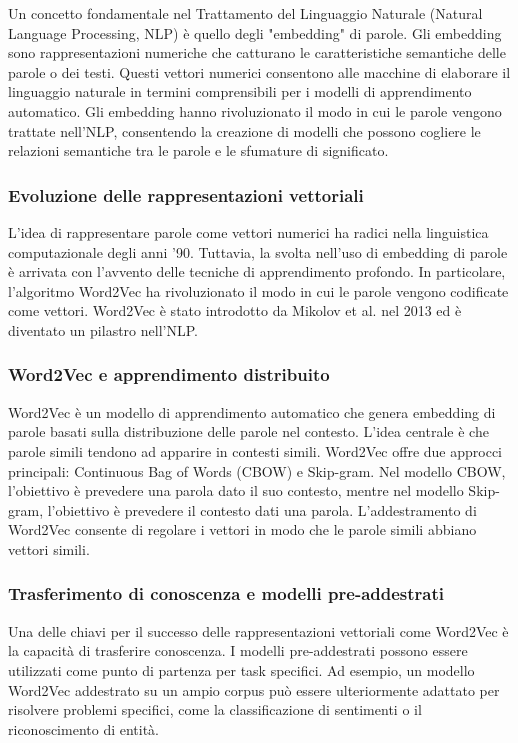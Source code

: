 Un concetto fondamentale nel Trattamento del Linguaggio Naturale (Natural Language Processing, NLP) è quello degli "embedding" di parole. Gli embedding sono rappresentazioni numeriche che catturano le caratteristiche semantiche delle parole o dei testi. Questi vettori numerici consentono alle macchine di elaborare il linguaggio naturale in termini comprensibili per i modelli di apprendimento automatico. Gli embedding hanno rivoluzionato il modo in cui le parole vengono trattate nell'NLP, consentendo la creazione di modelli che possono cogliere le relazioni semantiche tra le parole e le sfumature di significato.

\subsubsection{Evoluzione delle rappresentazioni vettoriali}
L'idea di rappresentare parole come vettori numerici ha radici nella linguistica computazionale degli anni '90. Tuttavia, la svolta nell'uso di embedding di parole è arrivata con l'avvento delle tecniche di apprendimento profondo. In particolare, l'algoritmo Word2Vec ha rivoluzionato il modo in cui le parole vengono codificate come vettori. Word2Vec è stato introdotto da Mikolov et al. nel 2013 ed è diventato un pilastro nell'NLP.

\subsubsection{Word2Vec e apprendimento distribuito}
Word2Vec è un modello di apprendimento automatico che genera embedding di parole basati sulla distribuzione delle parole nel contesto. L'idea centrale è che parole simili tendono ad apparire in contesti simili. Word2Vec offre due approcci principali: Continuous Bag of Words (CBOW) e Skip-gram. Nel modello CBOW, l'obiettivo è prevedere una parola dato il suo contesto, mentre nel modello Skip-gram, l'obiettivo è prevedere il contesto dati una parola. L'addestramento di Word2Vec consente di regolare i vettori in modo che le parole simili abbiano vettori simili.

\subsubsection{Trasferimento di conoscenza e modelli pre-addestrati}
Una delle chiavi per il successo delle rappresentazioni vettoriali come Word2Vec è la capacità di trasferire conoscenza. I modelli pre-addestrati possono essere utilizzati come punto di partenza per task specifici. Ad esempio, un modello Word2Vec addestrato su un ampio corpus può essere ulteriormente adattato per risolvere problemi specifici, come la classificazione di sentimenti o il riconoscimento di entità.

